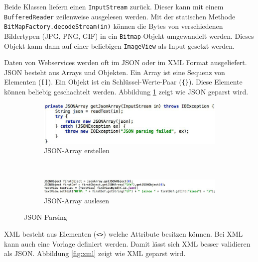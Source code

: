Beide Klassen liefern einen \texttt{InputStream} zurück. Dieser kann mit einem \texttt{BufferedReader} zeilenweise ausgelesen werden. Mit der statischen Methode \texttt{BitMapFactory.decodeStream(in)} können die Bytes von verschiedenen Bildertypen (JPG, PNG, GIF) in ein \texttt{Bitmap}-Objekt umgewandelt werden. Dieses Objekt kann dann auf einer beliebigen \texttt{ImageView} als Input gesetzt werden.

Daten von Webservices werden oft im JSON oder im XML Format ausgeliefert. JSON besteht aus Arrays und Objekten. Ein Array ist eine Sequenz von Elementen (\texttt{[]}). Ein Objekt ist ein Schlüssel-Werte-Paar (\texttt{\{\}}). Diese Elemente können beliebig geschachtelt werden. Abbildung \ref{fig:json} zeigt wie JSON geparst wird.

\begin{figure}
	\centering
	\begin{subfigure}[b]{0.48\textwidth}
		\includegraphics[width=\textwidth]{fig/json-array-erstellen}
		\caption{JSON-Array erstellen}
	\end{subfigure}
	~
	\begin{subfigure}[b]{0.48\textwidth}
		\includegraphics[width=\textwidth]{fig/json-array-auslesen}
		\caption{JSON-Array auslesen}
	\end{subfigure}
	\caption{JSON-Parsing}
	\label{fig:json}
\end{figure}

XML besteht aus Elementen (\texttt{<>}) welche Attribute besitzen können. Bei XML kann auch eine Vorlage definiert werden. Damit lässt sich XML besser validieren als JSON. Abbildung \ref{fig:xml} zeigt wie XML geparst wird.

